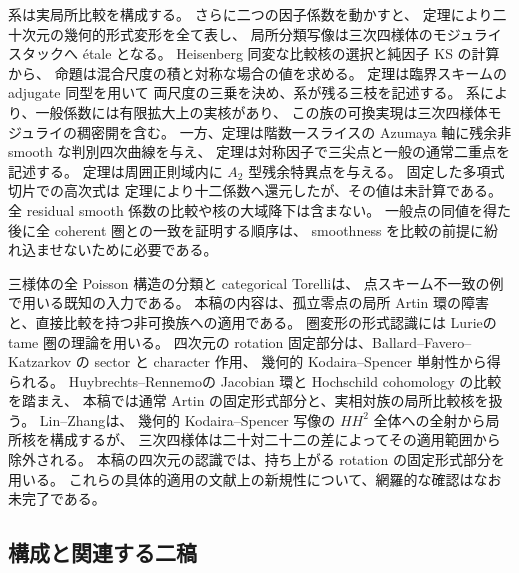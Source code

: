 系は実局所比較を構成する。
さらに二つの因子係数を動かすと、
定理により二十次元の幾何的形式変形を全て表し、
局所分類写像は三次四様体のモジュライスタックへ \'etale となる。
Heisenberg 同変な比較核の選択と純因子 KS の計算から、
命題は混合尺度の積と対称な場合の値を求める。
定理は臨界スキームの adjugate 同型を用いて
両尺度の三乗を決め、系が残る三枝を記述する。
系により、一般係数には有限拡大上の実核があり、
この族の可換実現は三次四様体モジュライの稠密開を含む。
一方、定理は階数一スライスの Azumaya 軸に残余非 smooth な判別四次曲線を与え、
定理は対称因子で三尖点と一般の通常二重点を記述する。
定理は周囲正則域内に $A_2$ 型残余特異点を与える。
固定した多項式切片での高次式は
定理により十二係数へ還元したが、その値は未計算である。
全 residual smooth 係数の比較や核の大域降下は含まない。
一般点の同値を得た後に全 coherent 圏との一致を証明する順序は、
smoothness を比較の前提に紛れ込ませないために必要である。

三様体の全 Poisson 構造の分類\cite[Theorem~1, Section~2.2]{Mayanskiy}と
categorical Torelli\cite[Theorem~1.1]{NFMThreefoldCategoricalTorelli}は、
点スキーム不一致の例で用いる既知の入力である。
本稿の内容は、孤立零点の局所 Artin 環の障害と、直接比較を持つ非可換族への適用である。
圏変形の形式認識には Lurie\cite{NFDAGX}の tame 圏の理論を用いる。
四次元の rotation 固定部分は、Ballard--Favero--Katzarkov
\cite[Corollary~5.41, Theorem~6.5]{NFBFKKernels}の sector と character 作用、
幾何的 Kodaira--Spencer 単射性から得られる。
Huybrechts--Rennemo\cite[Proposition~3.5, Remark~3.8]{NFHuybrechtsRennemo}の
Jacobian 環と Hochschild cohomology の比較を踏まえ、
本稿では通常 Artin の固定形式部分と、実相対族の局所比較核を扱う。
Lin--Zhang\cite[Theorem~2.2, Proposition~2.4, Remark~3.9]{NFMLinZhangPartners}は、
幾何的 Kodaira--Spencer 写像の $HH^2$ 全体への全射から局所核を構成するが、
三次四様体は二十対二十二の差によってその適用範囲から除外される。
本稿の四次元の認識では、持ち上がる rotation の固定形式部分を用いる。
これらの具体的適用の文献上の新規性について、網羅的な確認はなお未完了である。

\subsection{構成と関連する二稿}

